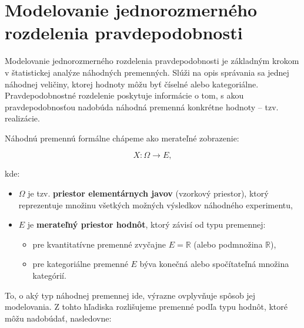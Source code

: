 \section{Modelovanie jednorozmerného rozdelenia pravdepodobnosti}\label{sec:1D_modelovanie}

Modelovanie jednorozmerného rozdelenia pravdepodobnosti je základným krokom v štatistickej analýze náhodných premenných. Slúži na opis správania sa jednej náhodnej veličiny, ktorej hodnoty môžu byť číselné alebo kategoriálne. Pravdepodobnostné rozdelenie poskytuje informácie o tom, s akou pravdepodobnosťou nadobúda náhodná premenná konkrétne hodnoty – tzv. realizácie.

Náhodnú premennú formálne chápeme ako merateľné zobrazenie:

\begin{equation}
X : \Omega \to E,
\end{equation}

kde:
\begin{itemize}
  \item $\Omega$ je tzv. \textbf{priestor elementárnych javov} (vzorkový priestor), ktorý reprezentuje množinu všetkých možných výsledkov náhodného experimentu,
  \item $E$ je \textbf{merateľný priestor hodnôt}, ktorý závisí od typu premennej:
  \begin{itemize}
    \item pre kvantitatívne premenné zvyčajne $E = \mathbb{R}$ (alebo podmnožina $\mathbb{R}$),
    \item pre kategoriálne premenné $E$ býva konečná alebo spočítateľná množina kategórií.
  \end{itemize}
\end{itemize}

To, o aký typ náhodnej premennej ide, výrazne ovplyvňuje spôsob jej modelovania. Z tohto hľadiska rozlišujeme premenné podľa typu hodnôt, ktoré môžu nadobúdať, nasledovne:

